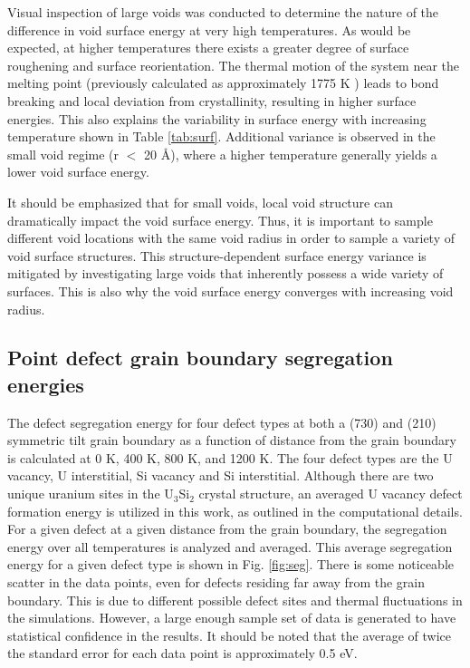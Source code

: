 \documentclass[review]{elsarticle}
\providecommand{\DIFdelend}{} %
\DeclareRobustCommand{\DIFdelend}{\DIFOaddend \let\includegraphics\DIFOincludegraphics} %
\begin{document}
\DIFdelend Visual inspection of large voids was conducted to determine the nature of the difference in void surface energy at very high temperatures. As would be expected, at higher temperatures there exists a greater degree of surface roughening and surface reorientation. The thermal motion of the system near the melting point (previously calculated as approximately 1775 K \cite{beelerUSi}) leads to bond breaking and local deviation from crystallinity, resulting in higher surface energies. This also explains the variability in surface energy with increasing temperature shown in Table \ref{tab:surf}. Additional variance is observed in the small void regime (r $<$ 20 {\AA}), where a higher temperature generally yields a lower void surface energy. 

It should be emphasized that for small voids, local void structure can dramatically impact the void surface energy. Thus, it is important to sample different void locations with the same void radius in order to sample a variety of void surface structures. This structure-dependent surface energy variance is mitigated by investigating large voids that inherently possess a wide variety of surfaces. This is also why the void surface energy converges with increasing void radius. 

\FloatBarrier

\subsection{Point defect grain boundary segregation energies}

The defect segregation energy for four defect types at both a (730) and (210) symmetric tilt grain boundary as a function of distance from the grain boundary is calculated at 0 K, 400 K, 800 K, and 1200 K. The four defect types are the U vacancy, U interstitial, Si vacancy and Si interstitial. Although there are two unique uranium sites in the U$_{3}$Si$_{2}$ crystal structure, an averaged U vacancy defect formation energy is utilized in this work, as outlined in the computational details. For a given defect at a given distance from the grain boundary, the segregation energy over all temperatures is analyzed and averaged. This average segregation energy for a given defect type is shown in Fig. \ref{fig:seg}. There is some noticeable scatter in the data points, even for defects residing far away from the grain boundary. This is due to different possible defect sites and thermal fluctuations in the simulations. However, a large enough sample set of data is generated to have statistical confidence in the results. It should be noted that the average of twice the standard error for each data point is approximately 0.5 eV. 
\end{document}
